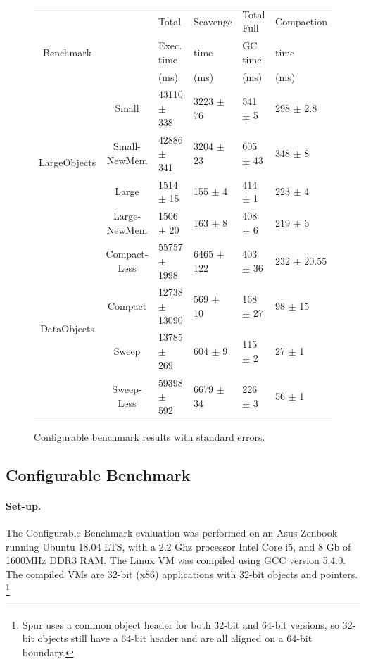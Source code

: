 \documentclass[10pt, sigplan]{acmart}
\begin{document}
\begin{figure}[b!]
\begin{tabular}{|c|c|l|l|l|l|}
   \hline
  & & Total   & Scavenge  & Total Full  & Compaction   \\
 Benchmark & &  Exec. time &  time & GC time &  time \\
  & &  (ms) &  (ms) & (ms) &  (ms)\\
   \hline
   \multirow{4}{*}{LargeObjects} & Small 	& 43110 $\pm$ 338 &	3223 $\pm$ 76 	& 541 $\pm$ 5 	&298 $\pm$ 2.8  \\
    				    & Small-NewMem 	& 42886 $\pm$ 341 &	3204 $\pm$ 23 	& 605 $\pm$ 43 	&348 $\pm$ 8  \\
    				    & Large 	& 1514 $\pm$ 15 &	155 $\pm$ 4 	& 414 $\pm$ 1 	&223 $\pm$ 4  \\
    				    & Large-NewMem 		& 1506 $\pm$ 20 &	163 $\pm$ 8 	& 408 $\pm$ 6 	&219 $\pm$ 6  \\
   \hline
   \multirow{4}{*}{DataObjects} 	& Compact-Less 		& 55757 $\pm$ 1998 &	6465 $\pm$ 122 	& 403 $\pm$ 36 	&232 $\pm$ 20.55  \\
    				    			& Compact 	& 12738 $\pm$ 13090 &	569 $\pm$ 10 	& 168 $\pm$ 27 	&98 $\pm$ 15  \\
    				    & Sweep 	& 13785 $\pm$ 269 &	604 $\pm$ 9 	& 115 $\pm$ 2 	&27 $\pm$ 1 \\
    				    & Sweep-Less 		& 59398 $\pm$ 592 &	6679 $\pm$ 34 	& 226 $\pm$ 3 	&56 $\pm$ 1 \\

   \hline
\end{tabular} 
\caption{Configurable benchmark results with standard errors.} \label{ConfigRes2}
\end{figure}


\subsection{Configurable Benchmark}

\paragraph{Set-up.}The Configurable Benchmark evaluation was performed on an Asus Zenbook running Ubuntu 18.04 LTS, with a 2.2 Ghz processor Intel Core i5, and 8 Gb of 1600MHz DDR3 RAM. The Linux VM was compiled using GCC version 5.4.0. The compiled VMs are 32-bit (x86) applications with 32-bit objects and pointers. \footnote{Spur uses a common object header for both 32-bit and 64-bit versions, so 32-bit objects still have a 64-bit header and are all aligned on a 64-bit boundary.}
\end{document}
